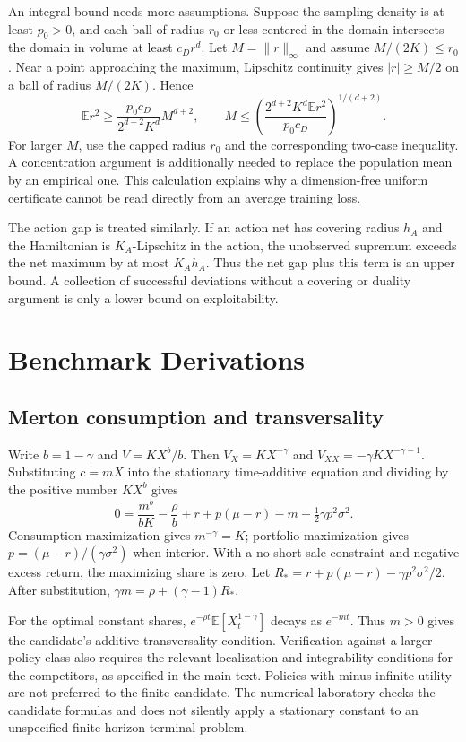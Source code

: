 \documentclass[ecta,draft]{econsocart}
\theoremstyle{definition}
\theoremstyle{remark}
\newcommand{\E}{\mathbb E}
\begin{document}
An integral bound needs more assumptions. Suppose the sampling density is at least $p_0>0$, and each ball of radius $r_0$ or less centered in the domain intersects the domain in volume at least $c_Dr^d$. Let $M=\|r\|_\infty$ and assume $M/(2K)\leq r_0$. Near a point approaching the maximum, Lipschitz continuity gives $|r|\geq M/2$ on a ball of radius $M/(2K)$. Hence
\[
 \E r^2\geq\frac{p_0c_D}{2^{d+2}K^d}M^{d+2},\qquad
 M\leq\left(\frac{2^{d+2}K^d\E r^2}{p_0c_D}\right)^{1/(d+2)}.
\]
For larger $M$, use the capped radius $r_0$ and the corresponding two-case inequality. A concentration argument is additionally needed to replace the population mean by an empirical one. This calculation explains why a dimension-free uniform certificate cannot be read directly from an average training loss.

The action gap is treated similarly. If an action net has covering radius $h_A$ and the Hamiltonian is $K_A$-Lipschitz in the action, the unobserved supremum exceeds the net maximum by at most $K_Ah_A$. Thus the net gap plus this term is an upper bound. A collection of successful deviations without a covering or duality argument is only a lower bound on exploitability.

\section{Benchmark Derivations}
\subsection{Merton consumption and transversality}
Write $b=1-\gamma$ and $V=KX^b/b$. Then $V_X=KX^{-\gamma}$ and $V_{XX}=-\gamma KX^{-\gamma-1}$. Substituting $c=mX$ into the stationary time-additive equation and dividing by the positive number $KX^b$ gives
\[
 0=\frac{m^b}{bK}-\frac\rho b+r+p(\mu-r)-m-\tfrac12\gamma p^2\sigma^2.
\]
Consumption maximization gives $m^{-\gamma}=K$; portfolio maximization gives $p=(\mu-r)/(\gamma\sigma^2)$ when interior. With a no-short-sale constraint and negative excess return, the maximizing share is zero. Let $R_*=r+p(\mu-r)-\gamma p^2\sigma^2/2$. After substitution, $\gamma m=\rho+(\gamma-1)R_*$.

For the optimal constant shares, $e^{-\rho t}\E[X_t^{1-\gamma}]$ decays as $e^{-m t}$. Thus $m>0$ gives the candidate's additive transversality condition. Verification against a larger policy class also requires the relevant localization and integrability conditions for the competitors, as specified in the main text. Policies with minus-infinite utility are not preferred to the finite candidate. The numerical laboratory checks the candidate formulas and does not silently apply a stationary constant to an unspecified finite-horizon terminal problem.
\end{document}
